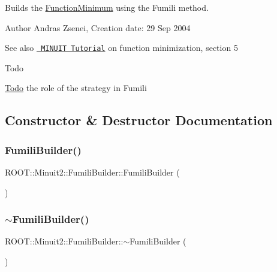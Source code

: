 Builds the \mbox{\hyperlink{classROOT_1_1Minuit2_1_1FunctionMinimum}{Function\+Minimum}} using the Fumili method.

\begin{DoxyAuthor}{Author}
Andras Zsenei, Creation date\+: 29 Sep 2004
\end{DoxyAuthor}
\begin{DoxySeeAlso}{See also}
\href{http://www.cern.ch/winkler/minuit/tutorial/mntutorial.pdf}{\texttt{ M\+I\+N\+U\+IT Tutorial}} on function minimization, section 5
\end{DoxySeeAlso}
\begin{DoxyRefDesc}{Todo}
\item[\mbox{\hyperlink{todo__todo000014}{Todo}}]the role of the strategy in Fumili\end{DoxyRefDesc}


\subsection{Constructor \& Destructor Documentation}
\mbox{\label{classROOT_1_1Minuit2_1_1FumiliBuilder_a79c7807308c680ea2e42829171ebe8c1}} 
\subsubsection{\texorpdfstring{FumiliBuilder()}{FumiliBuilder()}\hspace{0.1cm}{\footnotesize\ttfamily [1/2]}}
{\footnotesize\ttfamily R\+O\+O\+T\+::\+Minuit2\+::\+Fumili\+Builder\+::\+Fumili\+Builder (\begin{DoxyParamCaption}{ }\end{DoxyParamCaption})\hspace{0.3cm}{\ttfamily [inline]}}

\mbox{\label{classROOT_1_1Minuit2_1_1FumiliBuilder_a1de07586a1617732f49d59df92c44006}} 
\subsubsection{\texorpdfstring{$\sim$FumiliBuilder()}{~FumiliBuilder()}\hspace{0.1cm}{\footnotesize\ttfamily [1/2]}}
{\footnotesize\ttfamily R\+O\+O\+T\+::\+Minuit2\+::\+Fumili\+Builder\+::$\sim$\+Fumili\+Builder (\begin{DoxyParamCaption}{ }\end{DoxyParamCaption})\hspace{0.3cm}{\ttfamily [inline]}}

